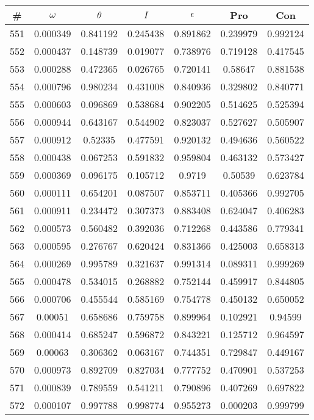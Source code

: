 \newpage
\begin{table}
\begin{tabular}{c|c|c|c|c|c|c}
\# & $\omega$ & $\theta$ & $I$ & $\epsilon$ & Pro & Con\\
\hline
551 & 0.000349 & 0.841192 & 0.245438 & 0.891862 & 0.239979 & 0.992124\\
552 & 0.000437 & 0.148739 & 0.019077 & 0.738976 & 0.719128 & 0.417545\\
553 & 0.000288 & 0.472365 & 0.026765 & 0.720141 & 0.58647 & 0.881538\\
554 & 0.000796 & 0.980234 & 0.431008 & 0.840936 & 0.329802 & 0.840771\\
555 & 0.000603 & 0.096869 & 0.538684 & 0.902205 & 0.514625 & 0.525394\\
556 & 0.000944 & 0.643167 & 0.544902 & 0.823037 & 0.527627 & 0.505907\\
557 & 0.000912 & 0.52335 & 0.477591 & 0.920132 & 0.494636 & 0.560522\\
558 & 0.000438 & 0.067253 & 0.591832 & 0.959804 & 0.463132 & 0.573427\\
559 & 0.000369 & 0.096175 & 0.105712 & 0.9719 & 0.50539 & 0.623784\\
560 & 0.000111 & 0.654201 & 0.087507 & 0.853711 & 0.405366 & 0.992705\\
561 & 0.000911 & 0.234472 & 0.307373 & 0.883408 & 0.624047 & 0.406283\\
562 & 0.000573 & 0.560482 & 0.392036 & 0.712268 & 0.443586 & 0.779341\\
563 & 0.000595 & 0.276767 & 0.620424 & 0.831366 & 0.425003 & 0.658313\\
564 & 0.000269 & 0.995789 & 0.321637 & 0.991314 & 0.089311 & 0.999269\\
565 & 0.000478 & 0.534015 & 0.268882 & 0.752144 & 0.459917 & 0.844805\\
566 & 0.000706 & 0.455544 & 0.585169 & 0.754778 & 0.450132 & 0.650052\\
567 & 0.00051 & 0.658686 & 0.759758 & 0.899964 & 0.102921 & 0.94599\\
568 & 0.000414 & 0.685247 & 0.596872 & 0.843221 & 0.125712 & 0.964597\\
569 & 0.00063 & 0.306362 & 0.063167 & 0.744351 & 0.729847 & 0.449167\\
570 & 0.000973 & 0.892709 & 0.827034 & 0.777752 & 0.470901 & 0.537253\\
571 & 0.000839 & 0.789559 & 0.541211 & 0.790896 & 0.407269 & 0.697822\\
572 & 0.000107 & 0.997788 & 0.998774 & 0.955273 & 0.000203 & 0.999799\\

\end{tabular}
\end{table}
